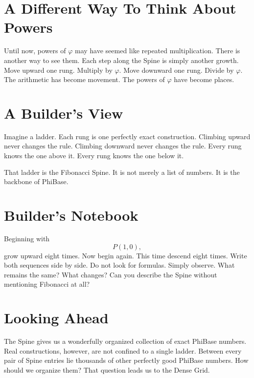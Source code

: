 \section*{A Different Way To Think About Powers}

Until now, powers of \(\varphi\) may have seemed like repeated multiplication. There is another way to see them. Each step along the Spine is simply another growth. Move upward one rung. Multiply by \(\varphi\). Move downward one rung. Divide by \(\varphi\). The arithmetic has become movement. The powers of \(\varphi\) have become places.

\section*{A Builder's View}

Imagine a ladder. Each rung is one perfectly exact construction. Climbing upward never changes the rule. Climbing downward never changes the rule. Every rung knows the one above it. Every rung knows the one below it.

That ladder is the Fibonacci Spine. It is not merely a list of numbers. It is the backbone of PhiBase.

\section*{Builder's Notebook}

Beginning with
\[
P(1,0),
\]
grow upward eight times. Now begin again. This time descend eight times. Write both sequences side by side. Do not look for formulas. Simply observe. What remains the same? What changes? Can you describe the Spine without mentioning Fibonacci at all?

\section*{Looking Ahead}

The Spine gives us a wonderfully organized collection of exact PhiBase numbers. Real constructions, however, are not confined to a single ladder. Between every pair of Spine entries lie thousands of other perfectly good PhiBase numbers. How should we organize them? That question leads us to the Dense Grid.
